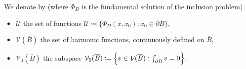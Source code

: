 \documentclass[10pt,xcolor={dvipsnames}]{beamer}
\theoremstyle{plain}
\theoremstyle{plain}
\begin{document}
\begin{frame}
\vspace{0.8cm}
We denote by (where $\Phi_D$ is the fundamental solution of the inclusion problem)
\begin{itemize}
 \item $\mathcal{U}$ the set of functions
$
 \mathcal{U}\coloneqq\bigl\{\Phi_D(x, x_0): x_0\in \partial B\bigr\},
$
 \item $\mathcal{V}(\overline{B})$ the set of harmonic functions, continuously defined on $\overline{B}$,
 \item $\mathcal{V}_0(\overline{B})$ the subspace 
$
  \mathcal{V}_0(\overline{B})\coloneqq\Bigl\{v\in\mathcal{V}(\overline{B}):\int_{\partial B} v = 0\Bigr\}.
$
\end{itemize}
\end{frame}
\end{document}
